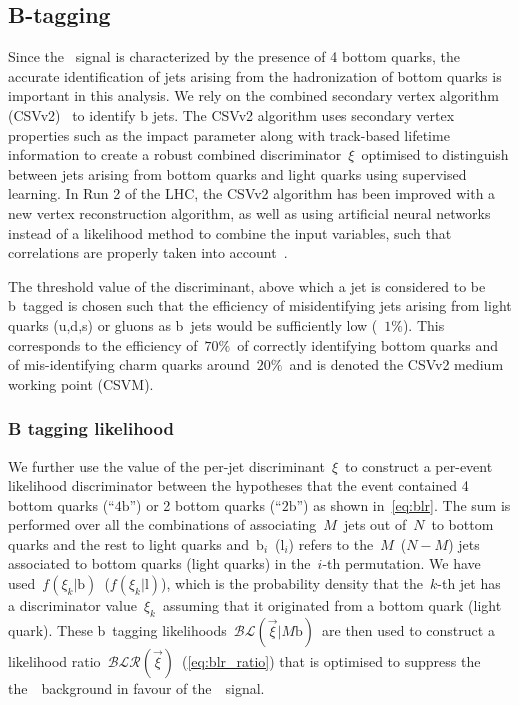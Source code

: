 \subsection{B-tagging}
\label{sec:object_id_btag}

Since the \ttHbb~signal is characterized by the presence of 4 bottom quarks, the accurate identification of jets arising from the hadronization of bottom quarks is important in this analysis. We rely on the combined secondary vertex algorithm (CSVv2)~\cite{Chatrchyan:2012jua} to identify b jets. The CSVv2 algorithm uses secondary vertex properties such as the impact parameter along with track-based lifetime information to create a robust combined discriminator~$\xi$~optimised to distinguish between jets arising from bottom quarks and light quarks using supervised learning. In Run 2 of the LHC, the CSVv2 algorithm has been improved with a new vertex reconstruction algorithm, as well as using artificial neural networks instead of a likelihood method to combine the input variables, such that correlations are properly taken into account~\cite{CMS-PAS-BTV-15-001}.

The threshold value of the discriminant, above which a jet is considered to be b~tagged is chosen such that the efficiency of misidentifying jets arising from light quarks (u,d,s) or gluons as b~jets would be sufficiently low (~$1\%$). This corresponds to the efficiency of~$70\%$~of correctly identifying bottom quarks and of mis-identifying charm quarks around~$20\%$~and is denoted the CSVv2 medium working point (CSVM).

\subsubsection{B tagging likelihood}
We further use the value of the per-jet discriminant~$\xi$~to construct a per-event likelihood discriminator between the hypotheses that the event contained 4 bottom quarks (``$4\mathrm{b}$'') or 2 bottom quarks (``$2\mathrm{b}$'') as shown in~\cref{eq:blr}. The sum is performed over all the combinations of associating~$M$~jets out of~$N$~to bottom quarks and the rest to light quarks and~$\mathrm{b}_i$~($\mathrm{l}_i$) refers to the~$M$~($N-M$) jets associated to bottom quarks (light quarks) in the~$i$-th permutation. We have used~$f(\xi_k | \mathrm{b})$~($f(\xi_k | \mathrm{l})$), which is the probability density that the~$k$-th jet has a discriminator value~$\xi_k$~assuming that it originated from a bottom quark (light quark). These b~tagging likelihoods~$\mathcal{BL}(\vec{\xi} | M\mathrm{b})$~are then used to construct a likelihood ratio~$\mathcal{BLR}(\vec{\xi})$~(\cref{eq:blr_ratio}) that is optimised to suppress the the~\ttlf~background in favour of the~\ttHbb~signal.

